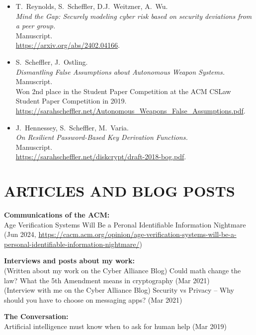 \documentclass{res}
\begin{document}
\begin{resume}
\begin{itemize}
\item[\scramDeviations] T.~Reynolds, S.~Scheffler, D.J.~Weitzner, A.~Wu. \\
\emph{Mind the Gap: Securely modeling cyber risk based on security deviations from a peer group.} \\
Manuscript.  \\
\url{https://arxiv.org/abs/2402.04166}.

\item[\autonomousWeapons] S.~Scheffler, J.~Ostling. \\
\emph{Dismantling False Assumptions about Autonomous Weapon Systems.} \\
Manuscript.  \\
Won 2nd place in the Student Paper Competition at the ACM CSLaw Student Paper Competition in 2019. \\
\url{https://sarahscheffler.net/Autonomous_Weapons_False_Assumptions.pdf}.

\item[\bog] J.~Hennessey, S.~Scheffler, M.~Varia. \\
\emph{On Resilient Password-Based Key Derivation Functions.} \\
Manuscript.  \\
\url{https://sarahscheffler.net/diskcrypt/draft-2018-bog.pdf}.
\end{itemize}




\section{ARTICLES AND BLOG POSTS}  
\vspace{0.1in}

\textbf{Communications of the ACM:} \\
    Age Verification Systems Will Be a Peronal Identifiable Information Nightmare (Jun 2024, \url{https://cacm.acm.org/opinion/age-verification-systems-will-be-a-personal-identifiable-information-nightmare/})

\textbf{Interviews and posts about my work:} \\
    (Written about my work on the Cyber Alliance Blog) Could math change the law? What the 5th Amendment means in cryptography (Mar 2021) \\
    (Interview with me on the Cyber Alliance Blog) Security vs Privacy -- Why should you have to choose on messaging apps? (Mar 2021)

\textbf{The Conversation:} \\         
    Artificial intelligence must know when to ask for human help (Mar 2019) 


\end{resume}
\end{document}
